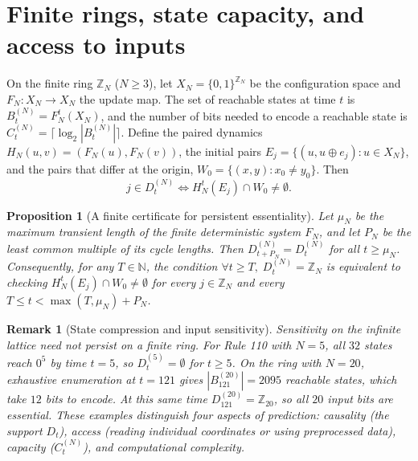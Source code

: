\documentclass[11pt, a4paper]{article}
\newtheorem{proposition}[theorem]{Proposition}
\newtheorem{remark}[theorem]{Remark}
\begin{document}
\section{Finite rings, state capacity, and access to inputs}

On the finite ring $\mathbb{Z}_N$ ($N \ge 3$), let $X_N = \{0, 1\}^{\mathbb{Z}_N}$ be the configuration space and $F_N : X_N \to X_N$ the update map. The set of reachable states at time $t$ is $B_t^{(N)} = F_N^t(X_N)$, and the number of bits needed to encode a reachable state is $C_t^{(N)} = \lceil \log_2 |B_t^{(N)}| \rceil$. Define the paired dynamics $H_N(u, v) = (F_N(u), F_N(v))$, the initial pairs $E_j = \{ (u, u \oplus e_j) : u \in X_N \}$, and the pairs that differ at the origin, $W_0 = \{ (x, y) : x_0 \ne y_0 \}$. Then
\begin{equation}
j \in D_t^{(N)} \iff H_N^t(E_j) \cap W_0 \ne \emptyset.
\end{equation}

\begin{proposition}[A finite certificate for persistent essentiality]\label{prop:ring_cert}
Let $\mu_N$ be the maximum transient length of the finite deterministic system $F_N$, and let $P_N$ be the least common multiple of its cycle lengths. Then $D_{t+P_N}^{(N)} = D_t^{(N)}$ for all $t \ge \mu_N$. Consequently, for any $T \in \mathbb{N}$, the condition $\forall t \ge T,\; D_t^{(N)} = \mathbb{Z}_N$ is equivalent to checking $H_N^t(E_j) \cap W_0 \ne \emptyset$ for every $j \in \mathbb{Z}_N$ and every $T \le t < \max(T, \mu_N) + P_N$.
\end{proposition}

\begin{remark}[State compression and input sensitivity]
Sensitivity on the infinite lattice need not persist on a finite ring. For Rule 110 with $N = 5$, all $32$ states reach $0^5$ by time $t = 5$, so $D_t^{(5)} = \emptyset$ for $t \ge 5$. On the ring with $N = 20$, exhaustive enumeration at $t = 121$ gives $|B_{121}^{(20)}| = 2095$ reachable states, which take $12$ bits to encode. At this same time $D_{121}^{(20)} = \mathbb{Z}_{20}$, so all $20$ input bits are essential. These examples distinguish four aspects of prediction: \emph{causality} (the support $D_t$), \emph{access} (reading individual coordinates or using preprocessed data), \emph{capacity} ($C_t^{(N)}$), and \emph{computational complexity}.
\end{remark}
\end{document}
